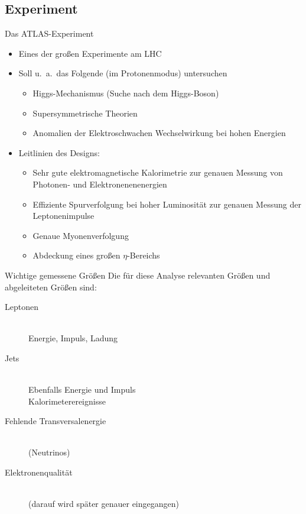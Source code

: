 \documentclass{beamer}
\begin{document}
\subsection{Experiment}
\begin{frame}{Das ATLAS-Experiment}
  \begin{itemize}
    \item Eines der großen Experimente am LHC
    \item Soll u.~a.\ das Folgende (im Protonenmodus) untersuchen
      \begin{itemize}
        \item Higgs-Mechanismus (Suche nach dem Higgs-Boson)
        \item Supersymmetrische Theorien
        \item Anomalien der Elektroschwachen Wechselwirkung bei hohen Energien
      \end{itemize} \pause
      \vskip10pt
    \item Leitlinien des Designs:
      \begin{itemize}
        \item Sehr gute elektromagnetische Kalorimetrie zur genauen Messung von
          Photonen- und Elektronenenenergien
        \item Effiziente Spurverfolgung bei hoher Luminosität zur genauen
          Messung der Leptonenimpulse
        \item Genaue Myonenverfolgung 
        \item Abdeckung eines großen $\eta$-Bereichs
      \end{itemize}
  \end{itemize}
\end{frame}

\begin{frame}{Wichtige gemessene Größen}
  Die für diese Analyse relevanten Größen und abgeleiteten Größen sind:
  \begin{description}
    \item[Leptonen] ~ \\
      Energie, Impuls, Ladung \pause
    \item[Jets] ~ \\
      Ebenfalls Energie und Impuls \\
      Kalorimeterereignisse \pause
    \item[Fehlende Transversalenergie] ~ \\
      (Neutrinos) \pause
    \item[Elektronenqualität] ~ \\
      (darauf wird später genauer eingegangen)
  \end{description}
\end{frame}
\end{document}
